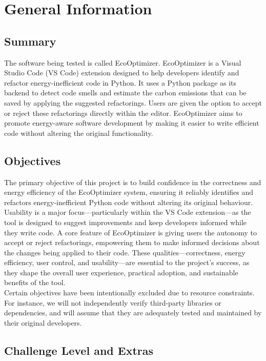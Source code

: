 \documentclass[12pt, titlepage]{article}
\begin{document}
\section{General Information}

\subsection{Summary}

The software being tested is called EcoOptimizer. EcoOptimizer is a Visual Studio Code (VS Code) extension designed to help developers identify and refactor energy-inefficient code in Python. It uses a Python package as its backend to detect code smells and estimate the carbon emissions that can be saved by applying the suggested refactorings. Users are given the option to accept or reject these refactorings directly within the editor. EcoOptimizer aims to promote energy-aware software development by making it easier to write efficient code without altering the original functionality.

\subsection{Objectives}

The primary objective of this project is to build confidence in the correctness and energy efficiency of the EcoOptimizer system, ensuring it reliably identifies and refactors energy-inefficient Python code without altering its original behaviour. Usability is a major focus—particularly within the VS Code extension—as the tool is designed to suggest improvements and keep developers informed while they write code. A core feature of EcoOptimizer is giving users the autonomy to accept or reject refactorings, empowering them to make informed decisions about the changes being applied to their code. These qualities—correctness, energy efficiency, user control, and usability—are essential to the project’s success, as they shape the overall user experience, practical adoption, and sustainable benefits of the tool.\\

\noindent Certain objectives have been intentionally excluded due to resource constraints. For instance, we will not independently verify third-party libraries or dependencies, and will assume that they are adequately tested and maintained by their original developers.

\subsection{Challenge Level and Extras}
\end{document}

